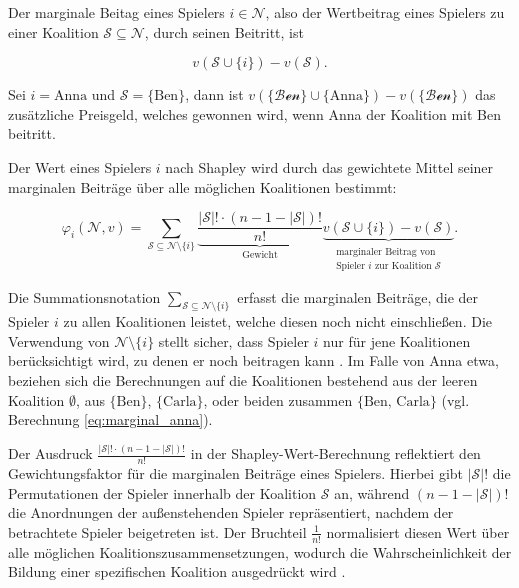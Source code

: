 Der marginale Beitag eines Spielers $i \in \mathcal{N}$, also der Wertbeitrag eines Spielers zu einer Koalition $\mathcal{S} \subseteq \mathcal{N}$, durch seinen Beitritt, ist

\begin{equation}
v(\mathcal{S} \cup \{i\}) - v(\mathcal{S}).
\label{eq:marignal}
\end{equation}


Sei $i = \text{Anna}$ und $\mathcal{S} = \{\text{Ben}\}$, dann ist $v(\mathcal{\{\text{Ben}\}} \cup \{\text{Anna}\}) - v(\mathcal{\{\text{Ben}\}})$ das
zusätzliche Preisgeld, welches gewonnen wird, wenn Anna der Koalition mit Ben beitritt. 

Der Wert eines Spielers $i$ nach Shapley wird durch das gewichtete Mittel seiner marginalen Beiträge 
über alle möglichen Koalitionen bestimmt:

\begin{equation}
\varphi_i (\mathcal{N}, v) = \sum_{\mathcal{S} \subseteq \mathcal{N} \setminus \{i\}} \underbrace{\frac{|\mathcal{S}|! \cdot (n - 1 - |\mathcal{S}|)!}{n!}}_{\text{Gewicht}} \underbrace{v(\mathcal{S} \cup \{i\}) - v(\mathcal{S})}_{\substack{\text{marginaler Beitrag von} \\ \text{Spieler $i$ zur Koalition $\mathcal{S}$}}}.
\end{equation}

Die Summationsnotation \(\sum_{\mathcal{S} \subseteq \mathcal{N} \setminus \{i\}}\) erfasst die marginalen Beiträge, 
die der Spieler \( i \) zu allen Koalitionen leistet, welche diesen noch nicht einschließen. Die Verwendung von 
\(\mathcal{N} \setminus \{i\}\) stellt sicher, dass Spieler \( i \) nur für jene Koalitionen berücksichtigt wird, 
zu denen er noch beitragen kann \cite[S. 22]{Molnar_2023}. Im Falle von Anna etwa, beziehen sich die Berechnungen auf die Koalitionen bestehend 
aus der leeren Koalition \(\emptyset\), aus \(\{\text{Ben}\}\), \(\{\text{Carla}\}\), oder beiden 
zusammen \(\{\text{Ben, Carla}\}\) (vgl. Berechnung \ref{eq:marginal_anna}).

Der Ausdruck \(\frac{|\mathcal{S}|! \cdot (n - 1 - |\mathcal{S}|)!}{n!}\) in der Shapley-Wert-Berechnung 
reflektiert den Gewichtungsfaktor für die marginalen Beiträge eines Spielers. Hierbei gibt \(|\mathcal{S}|!\) die Permutationen 
der Spieler innerhalb der Koalition \(\mathcal{S}\) an, während \((n - 1 - |\mathcal{S}|)!\) die Anordnungen der 
außenstehenden Spieler repräsentiert, nachdem der betrachtete Spieler beigetreten ist. 
Der Bruchteil \(\frac{1}{n!}\) normalisiert diesen Wert über alle möglichen Koalitionszusammensetzungen, 
wodurch die Wahrscheinlichkeit der Bildung einer spezifischen Koalition ausgedrückt wird \cite[S. 22]{Molnar_2023}.

